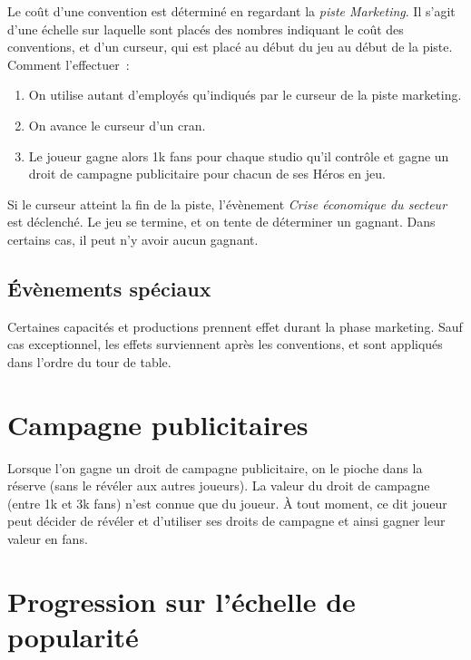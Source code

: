                 Le coût d'une convention est déterminé en regardant la \textit{piste Marketing}. Il s'agit
                d'une échelle sur laquelle sont placés des nombres indiquant le coût des conventions, et d'un
                curseur, qui est placé au début du jeu au début de la piste.
                \\
                Comment l'effectuer :
                    \begin{enumerate}
                        \item On utilise autant d'employés qu'indiqués par le curseur de la piste marketing.
                        \item On avance le curseur d'un cran.
                        \item Le joueur gagne alors 1k fans pour chaque studio qu'il contrôle et gagne un droit de campagne publicitaire pour chacun de ses Héros en jeu.
                    \end{enumerate}

                Si le curseur atteint la fin de la piste, l'évènement \textit{Crise économique du secteur} est déclenché.
                Le jeu se termine, et on tente de déterminer un gagnant. Dans certains cas, il peut n'y avoir aucun gagnant.

            \subsection{Évènements spéciaux}

                Certaines capacités et productions prennent effet durant la phase marketing.
                Sauf cas exceptionnel, les effets surviennent après les conventions, et sont
                appliqués dans l'ordre du tour de table.

        \section{Campagne publicitaires}

            Lorsque l'on gagne un droit de campagne publicitaire, on le pioche dans la réserve
            (sans le révéler aux autres joueurs). La valeur du droit de campagne (entre 1k et 3k fans)
            n'est connue que du joueur. À tout moment, ce dit joueur peut décider de révéler et
            d'utiliser ses droits de campagne et ainsi gagner leur valeur en fans.

        \section{Progression sur l'échelle de popularité}

